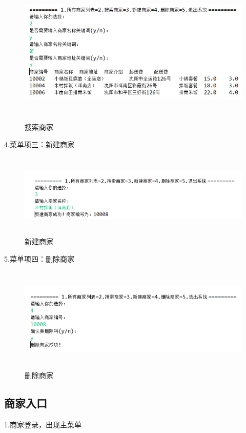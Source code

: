 \begin{figure}[H]
    \centering
    \includegraphics[width=15cm,height=7cm]{figures/jdbc3.png}
    \caption{搜索商家}
\end{figure}

\noindent
4.菜单项三：新建商家

\begin{figure}[H]
    \centering
    \includegraphics[width=15cm,height=4cm]{figures/jdbc4.png}
    \caption{新建商家}
\end{figure}

\noindent
5.菜单项四：删除商家

\begin{figure}[H]
    \centering
    \includegraphics[width=15cm,height=5cm]{figures/jdbc5.png}
    \caption{删除商家}
\end{figure}

\subsection{商家入口}
\noindent
1.商家登录，出现主菜单

